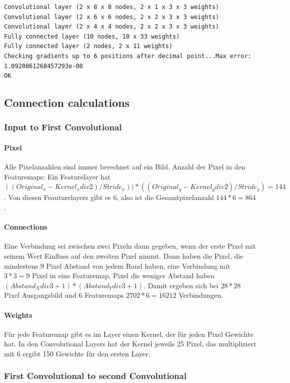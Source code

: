 \documentclass{article}
\begin{document}
\begin{lstlisting}[caption=Output Convolutional Test]
Convolutional layer (2 x 8 x 8 nodes, 2 x 1 x 3 x 3 weights)
Convolutional layer (2 x 6 x 6 nodes, 2 x 2 x 3 x 3 weights)
Convolutional layer (2 x 4 x 4 nodes, 2 x 2 x 3 x 3 weights)
Fully connected layer (10 nodes, 10 x 33 weights)
Fully connected layer (2 nodes, 2 x 11 weights)
Checking gradients up to 6 positions after decimal point...Max error: 1.0920861268457293e-08
OK
\end{lstlisting}

\subsection{Connection calculations}
\subsubsection{Input to First Convolutional}
\paragraph{Pixel}
Alle Pixelanzahlen sind immer berechnet auf ein Bild.
Anzahl der Pixel in den Featuremaps: Ein Featurelayer hat $((Original_x - Kernel_x div 2) / Stride_x)) * ((Original_y - Kernel_y div 2) / Stride_y) = 144$.
Von diesen Feauturelayers gibt es 6, also ist die Gesamtpixelanzahl $144 * 6 = 864$.
\paragraph{Connections}
Eine Verbindung sei zwischen zwei Pixeln dann gegeben, wenn der erste Pixel mit seinem Wert Einfluss auf den zweiten Pixel nimmt.
Dann haben die Pixel, die mindestens 9 Pixel Abstand von jedem Rand haben, eine Verbindung mit $3*3 = 9$ Pixel in eine Featuremap, Pixel die weniger Abstand haben $(Abstand_X div 3 + 1) * (Abstand_Y div 3 + 1)$.  Damit ergeben sich bei $28*28$ Pixel Ausgangsbild und 6 Featuremaps $2702 * 6 = 16212$ Verbindungen.
\paragraph{Weights}
Für jede Featuremap gibt es im Layer einen Kernel, der für jeden Pixel Gewichte hat. In den Convolutional Layers hat der Kernel jeweils 25 Pixel, das multipliziert mit 6 ergibt 150 Gewichte für den ersten Layer.

\subsubsection{First Convolutional to second Convolutional}
\end{document}
